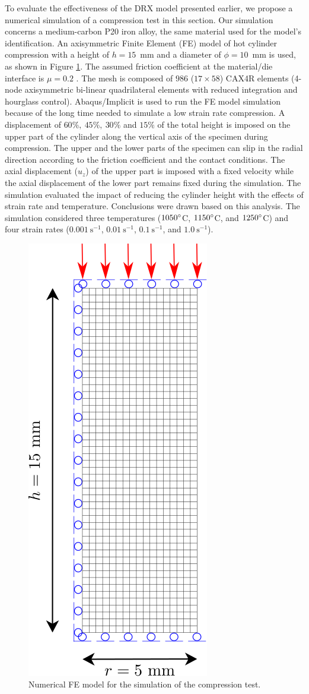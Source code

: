 \documentclass[metals,article,submit,pdftex,moreauthors]{Definitions/mdpi}
\DeclareRobustCommand{\ps}{\text{s}^{-1}}
\begin{document}
To evaluate the effectiveness of the DRX model presented earlier, we propose a numerical simulation of a compression test in this section.
Our simulation concerns a medium-carbon P20 iron alloy, the same material used for the model's identification.
An axisymmetric Finite Element (FE) model of hot cylinder compression with a height of $h=15$~mm and a diameter of $\phi=10$~mm is used, as shown in Figure \ref{fig:Mesh}.
The assumed friction coefficient at the material/die interface is $\mu=0.2$ \cite{zhang2019elevated,sun2020kinetics}.
The mesh is composed of $986$ ($17\times58$) CAX4R elements (4-node axisymmetric bi-linear quadrilateral elements with reduced integration and hourglass control).
Abaqus/Implicit is used to run the FE model simulation because of the long time needed to simulate a low strain rate compression.
A displacement of $60\%, ~45\%, ~30\%$ and $15\%$ of the total height is imposed on the upper part of the cylinder along the vertical axis of the specimen during compression.
The upper and the lower parts of the specimen can slip in the radial direction according to the friction coefficient and the contact conditions.
The axial displacement ($u_z$) of the upper part is imposed with a fixed velocity while the axial displacement of the lower part remains fixed during the simulation.
The simulation evaluated the impact of reducing the cylinder height with the effects of strain rate and temperature.
Conclusions were drawn based on this analysis.
The simulation considered three temperatures ($1050\degree$C, $1150\degree$C, and $1250\degree$C) and four strain rates ($0.001~\ps$, $0.01~\ps$, $0.1~\ps$, and $1.0~\ps$).
\begin{figure}[H]
\centering
\includegraphics[height=0.7\columnwidth]{Figures/CyCompression2}
\caption{Numerical FE model for the simulation of the compression test.}
\label{fig:Mesh}
\end{figure}
\end{document}
